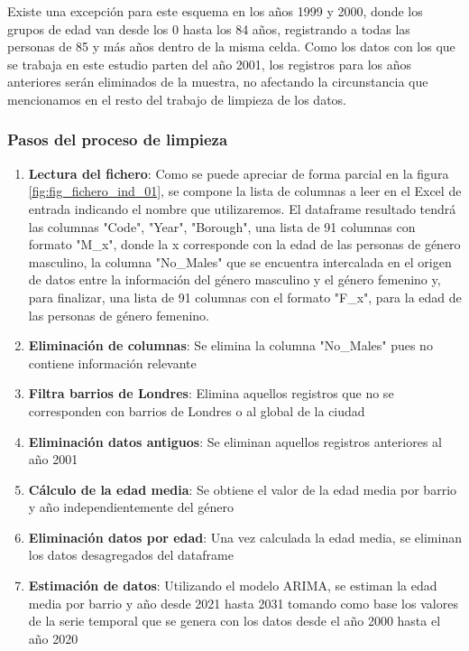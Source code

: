 \documentclass[12pt,a4paper,twoside]{book}
\begin{document}
Existe una excepción para este esquema en los años 1999 y 2000, donde los grupos de edad van desde los 0 hasta los 84 años, registrando a todas las personas de 85 y más años dentro de la misma celda. Como los datos con los que se trabaja en este estudio parten del año 2001, los registros para los años anteriores serán eliminados de la muestra, no afectando la circunstancia que mencionamos en el resto del trabajo de limpieza de los datos.

\subsubsection{Pasos del proceso de limpieza}

\begin{enumerate}
    \item \textbf{Lectura del fichero}: Como se puede apreciar de forma parcial en la figura \ref{fig:fig_fichero_ind_01}, se compone la lista de columnas a leer en el Excel de entrada indicando el nombre que utilizaremos. El dataframe resultado tendrá las columnas "Code", "Year", "Borough", una lista de 91 columnas con formato "M\_x", donde la x corresponde con la edad de las personas de género masculino, la columna "No\_Males" que se encuentra intercalada en el origen de datos entre la información del género masculino y el género femenino y, para finalizar, una lista de 91 columnas con el formato "F\_x", para la edad de las personas de género femenino.
    \item \textbf{Eliminación de columnas}: Se elimina la columna "No\_Males" pues no contiene información relevante
    \item \textbf{Filtra barrios de Londres}: Elimina aquellos registros que no se corresponden con barrios de Londres o al global de la ciudad
    \item \textbf{Eliminación datos antiguos}: Se eliminan aquellos registros anteriores al año 2001
    \item \textbf{Cálculo de la edad media}: Se obtiene el valor de la edad media por barrio y año independientemente del género
    \item \textbf{Eliminación datos por edad}: Una vez calculada la edad media, se eliminan los datos desagregados del dataframe
    \item \textbf{Estimación de datos}: Utilizando el modelo ARIMA, se estiman la edad media por barrio y año desde 2021 hasta 2031 tomando como base los valores de la serie temporal que se genera con los datos desde el año 2000 hasta el año 2020
\end{enumerate}
\end{document}
